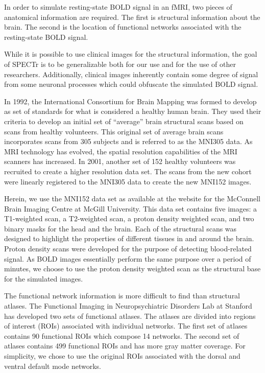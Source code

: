 In order to simulate resting-state BOLD signal in an fMRI, two pieces of anatomical information are required. The first is structural information about the brain. The second is the location of functional networks associated with the resting-state BOLD signal.

While it is possible to use clinical images for the structural information, the goal of SPECTr is to be generalizable both for our use and for the use of other researchers. Additionally, clinical images inherently contain some degree of signal from some neuronal processes which could obfuscate the simulated BOLD signal. 

In 1992, the International Consortium for Brain Mapping was formed to develop as set of standards for what is considered a healthy human brain. They used their criteria to develop an initial set of ``average'' brain structural scans based on scans from healthy volunteers. This original set of average brain scans incorporates scans from 305 subjects and is referred to as the MNI305 data. As MRI technology has evolved, the spatial resolution capabilities of the MRI scanners has increased. In 2001, another set of 152 healthy volunteers was recruited to create a higher resolution data set. The scans from the new cohort were linearly registered to the MNI305 data to create the new MNI152 images. %

Herein, we use the MNI152 data set as available at the website for the McConnell Brain Imaging Centre at McGill University. This data set contains five images: a T1-weighted scan, a T2-weighted scan, a proton density weighted scan, and two binary masks for the head and the brain. Each of the structural scans was designed to highlight the properties of different tissues in and around the brain. Proton density scans were developed for the purpose of detecting blood-related signal. As BOLD images essentially perform the same purpose over a period of minutes, we choose to use the proton density weighted scan as the structural base for the simulated images. %

The functional network information is more difficult to find than structural atlases. The Functional Imaging in Neuropsychiatric Disorders Lab at Stanford has developed two sets of functional atlases. The atlases are divided into regions of interest (ROIs) associated with individual networks. The first set of atlases contains 90 functional ROIs which compose 14 networks. The second set of atlases contains 499 functional ROIs and has more gray matter coverage. For simplicity, we chose to use the original ROIs associated with the dorsal and ventral default mode networks.

